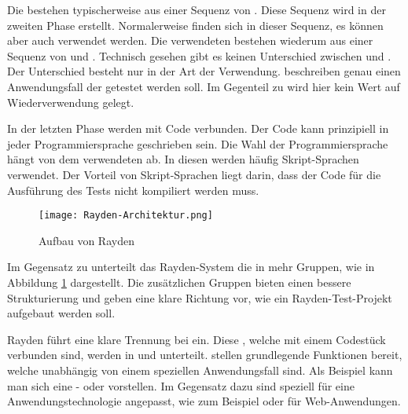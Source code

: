\SuperPar
Die  bestehen typischerweise aus einer Sequenz von . Diese Sequenz wird in der zweiten Phase erstellt. Normalerweise finden sich  in dieser Sequenz, es können aber auch  verwendet werden. Die verwendeten  bestehen wiederum aus einer Sequenz von  und . Technisch gesehen gibt es keinen Unterschied zwischen  und . Der Unterschied besteht nur in der Art der Verwendung.  beschreiben genau einen Anwendungsfall der getestet werden soll. Im Gegenteil zu  wird hier kein Wert auf Wiederverwendung gelegt.

\SuperPar
In der letzten Phase werden  mit Code verbunden. Der Code kann prinzipiell in jeder Programmiersprache geschrieben sein. Die Wahl der Programmiersprache hängt von dem verwendeten  ab. In diesen  werden häufig Skript-Sprachen verwendet. Der Vorteil von Skript-Sprachen liegt darin, dass der Code für die Ausführung des Tests nicht kompiliert werden muss.

\begin{figure}[h]
\centering
\texttt{[image: Rayden-Architektur.png]}
\caption{Aufbau von Rayden}
\label{fig:rayden-arch}
\end{figure}

\SuperPar
Im Gegensatz zu  unterteilt das Rayden-System die  in mehr Gruppen, wie in Abbildung \ref{fig:rayden-arch} dargestellt. Die zusätzlichen Gruppen bieten einen bessere Strukturierung und geben eine klare Richtung vor, wie ein Rayden-Test-Projekt aufgebaut werden soll.    

\SuperPar
Rayden führt eine klare Trennung bei  ein. Diese , welche mit einem Codestück verbunden sind, werden in  und  unterteilt.  stellen grundlegende Funktionen bereit, welche unabhängig von einem speziellen Anwendungsfall sind. Als Beispiel kann man sich eine - oder  vorstellen. Im Gegensatz dazu sind  speziell für eine Anwendungstechnologie angepasst, wie zum Beispiel  oder  für Web-Anwendungen. 

